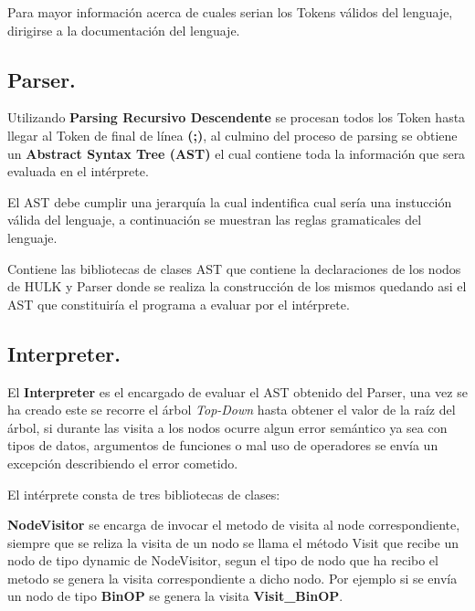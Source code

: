 \documentclass[a4paper,12pt]{article}
\begin{document}
	Para mayor información acerca de cuales serian los Tokens válidos del lenguaje, dirigirse a la documentación del lenguaje.
	

	
	\subsection{Parser.}\label{sub:lexer}
	Utilizando \textbf{Parsing Recursivo Descendente} se procesan todos los Token hasta llegar al Token de final de línea \textbf{(;)}, al culmino del proceso de parsing se obtiene un \textbf{Abstract Syntax Tree (AST)} el cual contiene toda la información que sera evaluada en el intérprete.
	
	El AST debe cumplir una jerarquía la cual indentifica cual sería una instucción válida del lenguaje, a continuación se muestran las reglas gramaticales del lenguaje.

	\vspace{0.5cm}
	
	\vspace{0.5cm}
	Contiene las bibliotecas de clases AST que contiene la declaraciones de los nodos de HULK y Parser donde se realiza la construcción de los mismos quedando asi el AST que constituiría el programa a evaluar por el intérprete.
	
	\subsection{Interpreter.}\label{sub:lexer}
	El \textbf{Interpreter} es el encargado de evaluar el AST obtenido del Parser, una vez se ha creado este se recorre el árbol \emph{Top-Down} hasta obtener el valor de la raíz del árbol, si durante las visita a los nodos ocurre algun error semántico ya sea con tipos de datos, argumentos de funciones o mal uso de operadores se envía un excepción describiendo el error cometido.
	
	El intérprete consta de tres bibliotecas de clases:
	
	\textbf{NodeVisitor} se encarga de invocar el metodo de visita al node correspondiente, siempre que se reliza la visita de un nodo se llama el método Visit que recibe un nodo de tipo dynamic de NodeVisitor, segun el tipo de nodo que ha recibo el metodo se genera la visita correspondiente a dicho nodo. Por ejemplo si se envía un nodo de tipo \textbf{BinOP} se genera la visita \textbf{Visit\_BinOP}.
	
\end{document}
